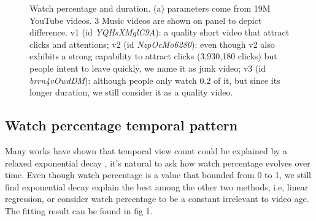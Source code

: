 \begin{figure}
\centering
{}

\caption{Watch percentage and duration. (a) parameters come from 19M YouTube videos. 3 Music videos are shown on panel to depict difference. v1 (id \textit{YQHsXMglC9A}): a quality short video that attract clicks and attentions; v2 (id \textit{NzpOcMo6280}): even though v2 also exhibits a strong capability to attract clicks (3,930,180 clicks) but people intent to leave quickly, we name it as junk video; v3 (id \textit{brrn4vOwdDM}): although people only watch 0.2 of it, but since its longer duration, we still consider it as a quality video.}
\end{figure}

\subsection{Watch percentage temporal pattern}

Many works have shown that temporal view count could be explained by a relaxed exponential decay \cite{(R.Crane and D.Sornette, viral videos short paper)}, it's natural to ask how watch percentage evolves over time. Even though watch percentage is a value that bounded from 0 to 1, we still find exponential decay explain the best among the other two methods, i.e, linear regression, or consider watch percentage to be a constant irrelevant to video age. The fitting result can be found in fig 1.

